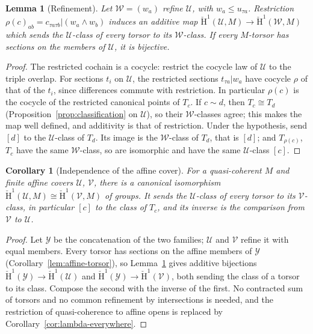 \documentclass[11pt]{amsart}
\newtheorem{lemma}[theorem]{Lemma}
\newtheorem{corollary}[theorem]{Corollary}
\theoremstyle{definition}\newtheorem{definition}[theorem]{Definition}
\theoremstyle{remark}\newtheorem{remark}[theorem]{Remark}
\newcommand{\CC}{\check{\mathrm H}}
\begin{document}
\begin{lemma}[Refinement]\label{lem:refinement}
Let $\mathcal W=(w_a)$ refine $\mathcal U$, with $w_a\le u_{\tau a}$.
Restriction $\rho(c)_{ab}=c_{\tau a\tau b}|(w_a\wedge w_b)$ induces an
additive map $\CC^1(\mathcal U,M)\to\CC^1(\mathcal W,M)$ which sends the
$\mathcal U$-class of every torsor to its $\mathcal W$-class. If every
$M$-torsor has sections on the members of $\mathcal U$, it is bijective.
\end{lemma}
\begin{proof}
The restricted cochain is a cocycle: restrict the cocycle law of
$\mathcal U$ to the triple overlap. For sections $t_i$ on $\mathcal U$,
the restricted sections $t_{\tau a}|w_a$ have cocycle $\rho$ of that of
the $t_i$, since differences commute with restriction. In particular
$\rho(c)$ is the cocycle of the restricted canonical points of $T_c$.
If $c\sim d$, then $T_c\cong T_d$ (Proposition~\ref{prop:classification}
on $\mathcal U$), so their $\mathcal W$-classes agree; this makes the map
well defined, and additivity is that of restriction. Under the
hypothesis, send $[d]$ to the $\mathcal U$-class of $T_d$. Its image is
the $\mathcal W$-class of $T_d$, that is $[d]$; and $T_{\rho(c)}$, $T_c$
have the same $\mathcal W$-class, so are isomorphic and have the same
$\mathcal U$-class $[c]$.
\end{proof}

\begin{corollary}[Independence of the affine cover]\label{cor:groupcomparison}
For a quasi-coherent $M$ and finite affine covers $\mathcal U$,
$\mathcal V$, there is a canonical isomorphism
$\CC^1(\mathcal U,M)\cong\CC^1(\mathcal V,M)$ of groups. It sends the
$\mathcal U$-class of every torsor to its $\mathcal V$-class, in
particular $[c]$ to the class of $T_c$, and its inverse is the
comparison from $\mathcal V$ to $\mathcal U$.
\end{corollary}
\begin{proof}
Let $\mathcal Y$ be the concatenation of the two families; $\mathcal U$
and $\mathcal V$ refine it with equal members. Every torsor has
sections on the affine members of $\mathcal Y$
(Corollary~\ref{lem:affine-torsor}), so Lemma~\ref{lem:refinement}
gives additive bijections $\CC^1(\mathcal Y)\to\CC^1(\mathcal U)$ and
$\CC^1(\mathcal Y)\to\CC^1(\mathcal V)$, both sending the class of a
torsor to its class. Compose the second with the inverse of the first.
No contracted sum of torsors and no common refinement by intersections
is needed, and the restriction of quasi-coherence to affine opens is
replaced by Corollary~\ref{cor:lambda-everywhere}.
\end{proof}
\end{document}
